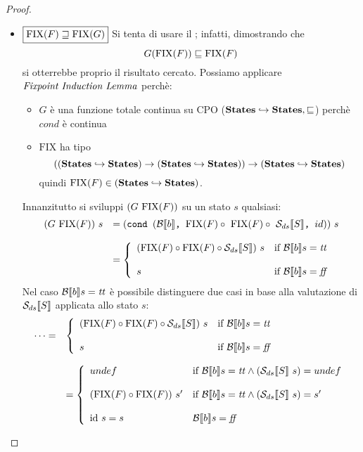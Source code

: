 {\begin{proof}
\begin{itemize}
	\item $\boxed{\textrm{\normalfont{FIX}}(F) \sqsupseteq \textrm{\normalfont{FIX}}(G)}$
	Si tenta di usare il \FPIL; infatti, dimostrando che
	$$
	G(\textrm{\normalfont{FIX}}(F)) \sqsubseteq \textrm{\normalfont{FIX}}(F)
	$$
	si otterrebbe proprio il risultato cercato.
        Possiamo applicare $\textit{Fixpoint Induction Lemma}$ perchè:
        \begin{itemize}
         \item $G$ è una funzione totale continua su CPO 
          ($\mbox{\textbf{States}} \hookrightarrow \mbox{\textbf{States}}, \sqsubseteq$) perchè $cond$ 
          è continua
         \item $\text{FIX}$ ha tipo
          $$
          ((\mbox{\textbf{States}} \hookrightarrow \mbox{\textbf{States}}) \rightarrow 
          (\mbox{\textbf{States}} \hookrightarrow \mbox{\textbf{States}})) \rightarrow
          (\mbox{\textbf{States}} \hookrightarrow \mbox{\textbf{States}})
          $$ 
          quindi $\textrm{\normalfont{FIX}}(F) \in 
          (\mbox{\textbf{States}} \hookrightarrow \mbox{\textbf{States}})$.
        \end{itemize}
        Innanzitutto si sviluppi $(G\ \fixp{F})$ su un stato $s$ qualsiasi:
        $$
        \begin{array}{ll}
          (G \ \textrm{\normalfont{FIX}}(F))\ s & = (\mbox{\normalfont{\texttt{cond }}} (\mathcal{B}{}\llbracket b \rrbracket \textrm{\normalfont{\texttt{, }}} \textrm{\normalfont{FIX}}(F) \circ\  \textrm{\normalfont{FIX}}(F) \circ \
          \mathcal{S}_{ds}\llbracket S \rrbracket \textrm{\normalfont{\texttt{, }}} id))\ s \\
          & \\
          & = \left\lbrace \begin{array}{ll} (\textrm{\normalfont{FIX}}(F) \circ{} \textrm{\normalfont{FIX}}(F) \circ{} \mathcal{S}_{ds}\llbracket S \rrbracket)\ s & \mbox{if } \mathcal{B} \llbracket b \rrbracket s =
          \mbox{\textit{tt}} \\ & \\ s & \mbox{if } \mathcal{B} \llbracket b \rrbracket s = \mbox{\textit{ff}} \\ \end{array} \right. 
        \end{array}
        $$
        Nel caso $\mathcal{B} \llbracket b \rrbracket s = \mbox{\textit{tt}}$ è possibile distinguere due casi in base
        alla valutazione di $\mathcal{S}_{ds}\llbracket S \rrbracket$ applicata allo stato $s$:
        $$
        \begin{array}{ll}
        \dots = 
        & \caseFun{(\fixp{F} \circ \fixp{F} \circ \dsCtxt{S})\ s}{\B{b} =
          \semtrue}{s}{\B{b} = \semfalse}  \\
        \\
        & = \left\lbrace 
          \begin{array}{ll}
            undef & \mbox{if } \B{b} = \semtrue \land (\dsCtxt{S}\  s) = undef  \\
            &  \\                  
            (\fixp{F} \circ \fixp{F})\ s' & \mbox{if } \B{b} = \semtrue \land (\dsCtxt{S}\ s) = s'  \\
                  & \\
            \idDS\ s = s & \B{b} = \semfalse\\
          \end{array}
          \right. \\
        \end{array}
        $$


\end{itemize}
\end{proof}}
